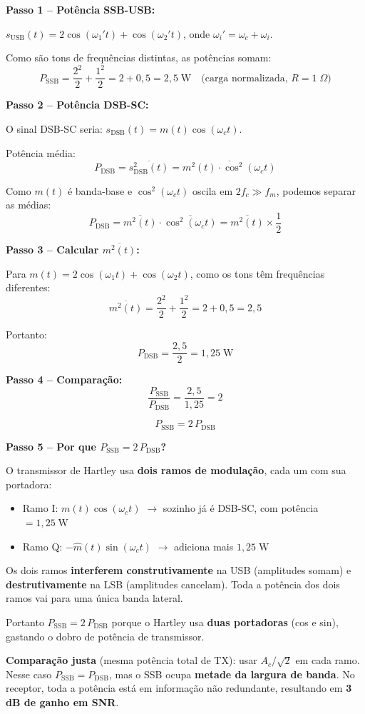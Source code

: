 \documentclass[11pt,a4paper]{article}
\begin{document}
\begin{resolucao}

\textbf{Passo 1 -- Potência SSB-USB:}

$s_{\text{USB}}(t) = 2\cos(\omega_1' t) + \cos(\omega_2' t)$, onde $\omega_i' = \omega_c + \omega_i$.

Como são tons de frequências distintas, as potências somam:
\[
  P_{\text{SSB}} = \frac{2^2}{2} + \frac{1^2}{2} = 2 + 0{,}5 = \boxed{2{,}5\;\text{W}} \quad \text{(carga normalizada, $R=1\;\Omega$)}
\]

\textbf{Passo 2 -- Potência DSB-SC:}

O sinal DSB-SC seria: $s_{\text{DSB}}(t) = m(t)\cos(\omega_c t)$.

Potência média:
\[
  P_{\text{DSB}} = \overline{s_{\text{DSB}}^2(t)} = \overline{m^2(t) \cdot \cos^2(\omega_c t)}
\]

Como $m(t)$ é banda-base e $\cos^2(\omega_c t)$ oscila em $2f_c \gg f_m$, podemos separar as médias:
\[
  P_{\text{DSB}} = \overline{m^2(t)} \cdot \overline{\cos^2(\omega_c t)} = \overline{m^2(t)} \times \frac{1}{2}
\]

\textbf{Passo 3 -- Calcular $\overline{m^2(t)}$:}

Para $m(t) = 2\cos(\omega_1 t) + \cos(\omega_2 t)$, como os tons têm frequências diferentes:
\[
  \overline{m^2(t)} = \frac{2^2}{2} + \frac{1^2}{2} = 2 + 0{,}5 = 2{,}5
\]

Portanto:
\[
  P_{\text{DSB}} = \frac{2{,}5}{2} = 1{,}25\;\text{W}
\]

\textbf{Passo 4 -- Comparação:}
\[
  \frac{P_{\text{SSB}}}{P_{\text{DSB}}} = \frac{2{,}5}{1{,}25} = 2
\]

\[
  \boxed{P_{\text{SSB}} = 2\,P_{\text{DSB}}}
\]

\textbf{Passo 5 -- Por que $P_{\text{SSB}} = 2\,P_{\text{DSB}}$?}

O transmissor de Hartley usa \textbf{dois ramos de modulação}, cada um com sua portadora:
\begin{itemize}
  \item Ramo I: $m(t)\cos(\omega_c t)$ \; $\longrightarrow$ \; sozinho já é DSB-SC, com potência $= 1{,}25\;\text{W}$
  \item Ramo Q: $-\hat{m}(t)\sin(\omega_c t)$ \; $\longrightarrow$ \; adiciona mais $1{,}25\;\text{W}$
\end{itemize}

Os dois ramos \textbf{interferem construtivamente} na USB (amplitudes somam) e \textbf{destrutivamente} na LSB (amplitudes cancelam). Toda a potência dos dois ramos vai para uma única banda lateral.

Portanto $P_{\text{SSB}} = 2\,P_{\text{DSB}}$ porque o Hartley usa \textbf{duas portadoras} (cos e sin), gastando o dobro de potência de transmissor.

\textbf{Comparação justa} (mesma potência total de TX): usar $A_c/\sqrt{2}$ em cada ramo. Nesse caso $P_{\text{SSB}} = P_{\text{DSB}}$, mas o SSB ocupa \textbf{metade da largura de banda}. No receptor, toda a potência está em informação não redundante, resultando em \textbf{3 dB de ganho em SNR}.
\end{resolucao}
\end{document}
